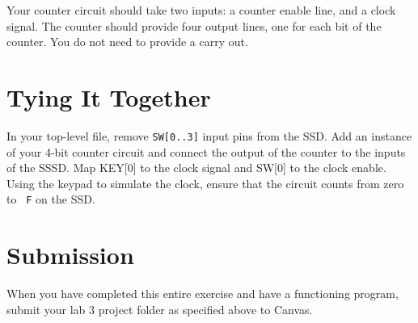 \documentclass[10pt]{article}
\begin{document}
Your counter circuit should take two inputs: a counter enable line,
and a clock signal. The counter should provide four output lines, one
for each bit of the counter. You do not need to provide a carry out.

\section{Tying It Together}

In your top-level file, remove {\tt SW[0..3]} input pins from the
SSD. Add an instance of your 4-bit counter circuit and connect the
output of the counter to the inputs of the SSSD. Map KEY[0] to the
clock signal and SW[0] to the clock enable. Using the keypad to
simulate the clock, ensure that the circuit counts from zero to {\tt
  F} on the SSD.

\section*{Submission}

When you have completed this entire exercise and have a functioning
program, submit your lab 3 project folder as specified above to Canvas.
\end{document}
